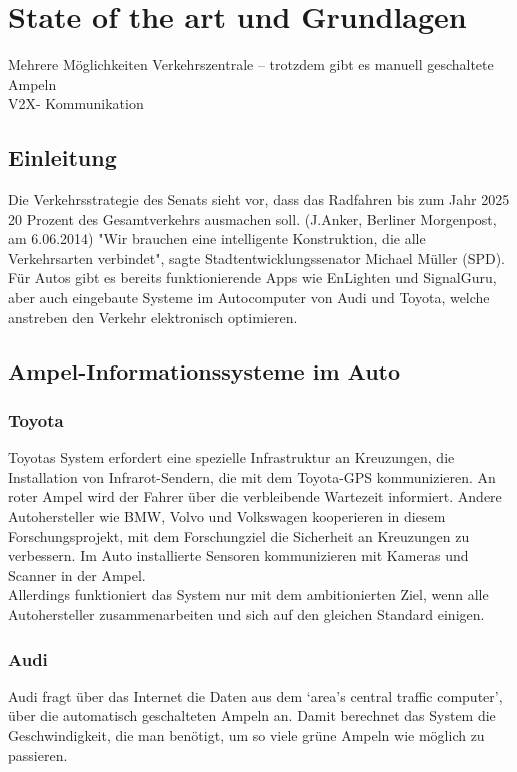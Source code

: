 \chapter{State of the art und Grundlagen}
Mehrere Möglichkeiten
Verkehrszentrale -- trotzdem gibt es manuell geschaltete Ampeln\\
\gls{V2X}- Kommunikation
\section{Einleitung}
Die Verkehrsstrategie des Senats sieht vor, dass das Radfahren bis zum Jahr 2025 20 Prozent des Gesamtverkehrs ausmachen soll. (J.Anker, Berliner Morgenpost, am 6.06.2014)
"Wir brauchen eine intelligente Konstruktion, die alle Verkehrsarten verbindet", sagte Stadtentwicklungssenator Michael Müller (SPD).\\
Für Autos gibt es bereits funktionierende Apps wie EnLighten und SignalGuru, aber auch eingebaute Systeme im Autocomputer von Audi und Toyota, welche anstreben den Verkehr elektronisch optimieren.
\section{Ampel-Informationssysteme im Auto}
\subsection{Toyota}
Toyotas System erfordert eine spezielle Infrastruktur an Kreuzungen, die Installation von Infrarot-Sendern, die mit dem Toyota-GPS kommunizieren. An roter Ampel wird der Fahrer über die verbleibende Wartezeit informiert. Andere Autohersteller wie BMW, Volvo und Volkswagen kooperieren in diesem Forschungsprojekt, mit dem Forschungziel die Sicherheit an Kreuzungen zu verbessern. Im Auto installierte Sensoren kommunizieren mit Kameras und Scanner in der Ampel. \\
Allerdings funktioniert das System nur mit dem ambitionierten Ziel, wenn alle Autohersteller zusammenarbeiten und sich auf den gleichen Standard einigen.
\subsection{Audi}
Audi fragt über das Internet die Daten aus dem ‘area’s central traffic computer’, über die automatisch geschalteten Ampeln an. Damit berechnet das System die Geschwindigkeit, die man benötigt, um so viele grüne Ampeln wie möglich zu passieren.\\
